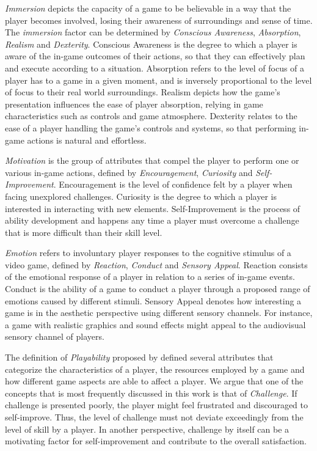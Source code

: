 \emph{Immersion} depicts the capacity of a game to be believable in a way that the player becomes involved, losing their awareness of surroundings and sense of time. The \emph{immersion} factor can be determined by \emph{Conscious Awareness}, \emph{Absorption}, \emph{Realism} and \emph{Dexterity}. Conscious Awareness is the degree to which a player is aware of the in-game outcomes of their actions, so that they can effectively plan and execute according to a situation. Absorption refers to the level of focus of a player has to a game in a given moment, and is inversely proportional to the level of focus to their real world surroundings. Realism depicts how the game's presentation influences the ease of player absorption, relying in game characteristics such as controls and game atmosphere. Dexterity relates to the ease of a player handling the game's controls and systems, so that performing in-game actions is natural and effortless.

\emph{Motivation} is the group of attributes that compel the player to perform one or various in-game actions, defined by \emph{Encouragement}, \emph{Curiosity} and \emph{Self-Improvement}. Encouragement is the level of confidence felt by a player when facing unexplored challenges. Curiosity is the degree to which a player is interested in interacting with new elements. Self-Improvement is the process of ability development and happens any time a player must overcome a challenge that is more difficult than their skill level. 

\emph{Emotion} refers to involuntary player responses to the cognitive stimulus of a video game, defined by \emph{Reaction}, \emph{Conduct} and \emph{Sensory Appeal}. Reaction consists of the emotional response of a player in relation to a series of in-game events. Conduct is the ability of a game to conduct a player through a proposed range of emotions caused by different stimuli. Sensory Appeal denotes how interesting a game is in the aesthetic perspective using different sensory channels. For instance, a game with realistic graphics and sound effects might appeal to the audiovisual sensory channel of players.

The definition of \emph{Playability} proposed by \citet{ARTICLE_FromUsabilityToPlayability} defined several attributes that categorize the characteristics of a player, the resources employed by a game and how different game aspects are able to affect a player. We argue that one of the concepts that is most frequently discussed in this work is that of  \emph{Challenge}. If challenge is presented poorly, the player might feel frustrated and discouraged to self-improve. Thus, the level of challenge must not deviate exceedingly from the level of skill by a player. In another perspective, challenge by itself can be a motivating factor for self-improvement and contribute to the overall satisfaction.  

